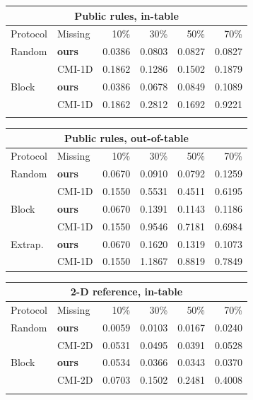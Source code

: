 \small
\begin{tabular}{llrrrr}\toprule
\multicolumn{6}{c}{Public rules, in-table} \\\midrule
Protocol & Missing & 10\% & 30\% & 50\% & 70\% \\\midrule
Random & \textbf{ours} & 0.0386 & 0.0803 & 0.0827 & 0.0827 \\
 & CMI-1D & 0.1862 & 0.1286 & 0.1502 & 0.1879 \\
\addlinespace
Block & \textbf{ours} & 0.0386 & 0.0678 & 0.0849 & 0.1089 \\
 & CMI-1D & 0.1862 & 0.2812 & 0.1692 & 0.9221 \\
\addlinespace
\bottomrule\end{tabular}

\vspace{2pt}

\begin{tabular}{llrrrr}\toprule
\multicolumn{6}{c}{Public rules, out-of-table} \\\midrule
Protocol & Missing & 10\% & 30\% & 50\% & 70\% \\\midrule
Random & \textbf{ours} & 0.0670 & 0.0910 & 0.0792 & 0.1259 \\
 & CMI-1D & 0.1550 & 0.5531 & 0.4511 & 0.6195 \\
\addlinespace
Block & \textbf{ours} & 0.0670 & 0.1391 & 0.1143 & 0.1186 \\
 & CMI-1D & 0.1550 & 0.9546 & 0.7181 & 0.6984 \\
\addlinespace
Extrap. & \textbf{ours} & 0.0670 & 0.1620 & 0.1319 & 0.1073 \\
 & CMI-1D & 0.1550 & 1.1867 & 0.8819 & 0.7849 \\
\bottomrule\end{tabular}

\vspace{2pt}

\begin{tabular}{llrrrr}\toprule
\multicolumn{6}{c}{2-D reference, in-table} \\\midrule
Protocol & Missing & 10\% & 30\% & 50\% & 70\% \\\midrule
Random & \textbf{ours} & 0.0059 & 0.0103 & 0.0167 & 0.0240 \\
 & CMI-2D & 0.0531 & 0.0495 & 0.0391 & 0.0528 \\
\addlinespace
Block & \textbf{ours} & 0.0534 & 0.0366 & 0.0343 & 0.0370 \\
 & CMI-2D & 0.0703 & 0.1502 & 0.2481 & 0.4008 \\
\addlinespace
\bottomrule\end{tabular}

